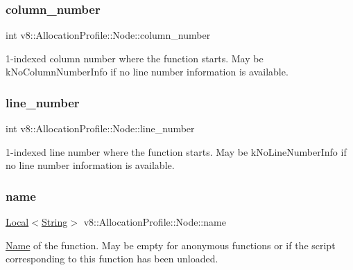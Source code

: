 \subsubsection{\texorpdfstring{column\+\_\+number}{column\_number}}
{\footnotesize\ttfamily int v8\+::\+Allocation\+Profile\+::\+Node\+::column\+\_\+number}

1-\/indexed column number where the function starts. May be k\+No\+Column\+Number\+Info if no line number information is available. \mbox{\label{structv8_1_1AllocationProfile_1_1Node_ac9773c92a3af3a9a9420337599e68bd9}} 
\subsubsection{\texorpdfstring{line\+\_\+number}{line\_number}}
{\footnotesize\ttfamily int v8\+::\+Allocation\+Profile\+::\+Node\+::line\+\_\+number}

1-\/indexed line number where the function starts. May be k\+No\+Line\+Number\+Info if no line number information is available. \mbox{\label{structv8_1_1AllocationProfile_1_1Node_af9f2c323d6a11e836c02e8ac88adc5a8}} 
\subsubsection{\texorpdfstring{name}{name}}
{\footnotesize\ttfamily \mbox{\hyperlink{classv8_1_1Local}{Local}}$<$\mbox{\hyperlink{classv8_1_1String}{String}}$>$ v8\+::\+Allocation\+Profile\+::\+Node\+::name}

\mbox{\hyperlink{classv8_1_1Name}{Name}} of the function. May be empty for anonymous functions or if the script corresponding to this function has been unloaded. \mbox{\label{structv8_1_1AllocationProfile_1_1Node_aa2a43ec43107692b2cfcb3b2b00aa801}} 
